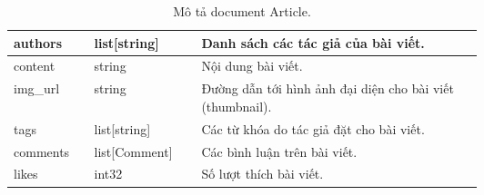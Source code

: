 \begin{table}[ht!]
\begin{tabular}{|llp{0.6\linewidth}|}
\multicolumn{1}{|l|}{authors}         & \multicolumn{1}{l|}{list{[}string{]}}      & Danh   sách các tác giả của bài viết.                                                                                                                   \\ \hline
\multicolumn{1}{|l|}{content}         & \multicolumn{1}{l|}{string}                & Nội   dung bài viết.                                                                                                                                    \\ \hline
\multicolumn{1}{|l|}{img\_url}        & \multicolumn{1}{l|}{string}                & Đường   dẫn tới hình ảnh đại diện cho bài viết (thumbnail).                                                                                             \\ \hline
\multicolumn{1}{|l|}{tags}            & \multicolumn{1}{l|}{list{[}string{]}}      & Các   từ khóa do tác giả đặt cho bài viết.                                                                                                              \\ \hline
\multicolumn{1}{|l|}{comments}        & \multicolumn{1}{l|}{list{[}Comment{]}}     & Các   bình luận trên bài viết.                                                                                                                          \\ \hline
\multicolumn{1}{|l|}{likes}           & \multicolumn{1}{l|}{int32}                 & Số   lượt thích bài viết.                                                                                                                               \\ \hline
\end{tabular}
    \caption{Mô tả document Article.}
    \label{table:schema-article}
\end{table}

